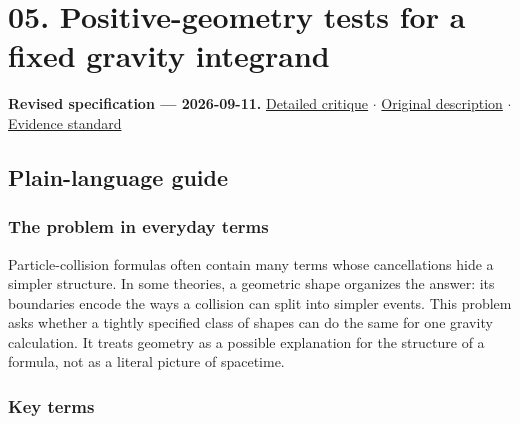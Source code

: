 \documentclass[
  11pt,
]{article}
\begin{document}
\section{05. Positive-geometry tests for a fixed gravity integrand}

\textbf{Revised specification --- 2026-09-11.}
\href{https://github.com/rick-stevens-ai/Pure-Thought/blob/main/reviews/05-Positive-Geometry-Gravity.md}{Detailed
critique} \ensuremath{\cdot}
\href{https://github.com/rick-stevens-ai/Pure-Thought/blob/main/archive/original-PRDs/05-Positive-Geometry-Gravity.md}{Original
description} \ensuremath{\cdot}
\href{https://github.com/rick-stevens-ai/Pure-Thought/blob/main/reviews/EVIDENCE-STANDARD.md}{Evidence
standard}

\subsection{Plain-language guide}

\subsubsection{The problem in everyday terms}

Particle-collision formulas often contain many terms whose cancellations
hide a simpler structure. In some theories, a geometric shape organizes
the answer: its boundaries encode the ways a collision can split into
simpler events. This problem asks whether a tightly specified class of
shapes can do the same for one gravity calculation. It treats geometry
as a possible explanation for the structure of a formula, not as a
literal picture of spacetime.

\subsubsection{Key terms}
\end{document}

